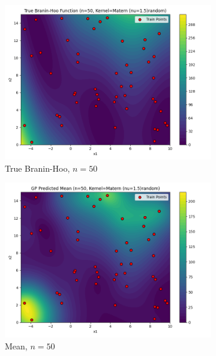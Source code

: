 \documentclass[a4paper,12pt]{article}
\begin{document}
\begin{figure}[H]
\begin{subfigure}{0.3\textwidth}
  \includegraphics[width=\linewidth]{Task-02/images/true_function_matern_n50_random.png}
  \caption{True Branin-Hoo, $n=50$}
\end{subfigure}
\begin{subfigure}{0.3\textwidth}
    \includegraphics[width=\linewidth]{Task-02/images/gp_mean_matern_n50_random.png}
    \caption{Mean, $n=50$}
\end{subfigure} 
\begin{subfigure}{0.3\textwidth}

\end{subfigure}
\end{figure}
\end{document}
